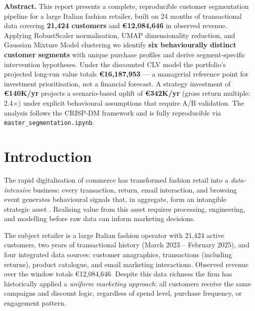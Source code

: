 \documentclass[10pt,a4paper]{article}
\newcommand{\eur}{€}
\begin{document}
\begin{center}
\begin{insightbox}
\small\textbf{Abstract.}
This report presents a complete, reproducible customer segmentation pipeline for a
large Italian fashion retailer, built on 24 months of transactional data covering
\textbf{21,424 customers} and \textbf{\eur12,084,646} in observed revenue. Applying
RobustScaler normalisation, UMAP dimensionality reduction, and Gaussian Mixture Model
clustering we identify \textbf{six behaviourally distinct customer segments} with unique
purchase profiles and derive segment-specific intervention hypotheses. Under the
discounted CLV model the portfolio's projected long-run value totals
\textbf{\eur16,187,953} --- a managerial reference point for investment prioritisation,
not a financial forecast. A strategy investment of \textbf{\eur140K/yr} projects a
scenario-based uplift of \textbf{\eur342K/yr} (gross return multiple: 2.4$\times$) under
explicit behavioural assumptions that require A/B validation. The analysis follows the
CRISP-DM framework and is fully reproducible via \texttt{master\_segmentation.ipynb}.
\end{insightbox}
\end{center}

\newpage

\section{Introduction}
\label{sec:intro}

The rapid digitalisation of commerce has transformed fashion retail into a
\textit{data-intensive} business: every transaction, return, email interaction,
and browsing event generates behavioural signals that, in aggregate, form an
intangible strategic asset \cite{haskel2018capitalism,corrado2009intangible}.
Realising value from this asset requires processing, engineering, and modelling
before raw data can inform marketing decisions.

The subject retailer is a large Italian fashion operator with 21,424 active
customers, two years of transactional history (March 2023 -- February 2025), and
four integrated data sources: customer anagraphics, transactions (including returns),
product catalogue, and email marketing interactions. Observed revenue over the
window totals \eur12,084,646. Despite this data richness the firm has historically
applied a \textit{uniform marketing approach}: all customers receive the same
campaigns and discount logic, regardless of spend level, purchase frequency, or
engagement pattern.
\end{document}
